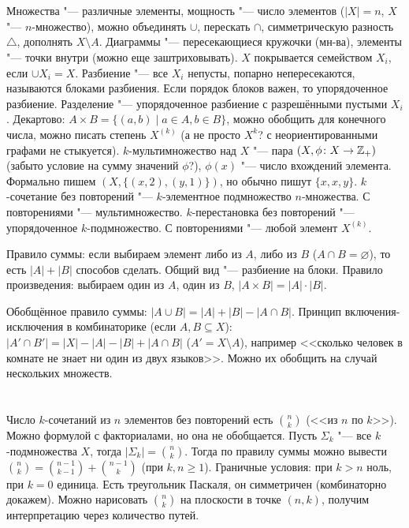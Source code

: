 \section{} %
Множества "--- различные элементы, мощность "--- число элементов ($|X|=n$, $X$ "--- $n$-множество),
можно объединять $\cup$, перескать $\cap$, симметрическую разность $\triangle$, дополнять $X \setminus A$.
Диаграммы "--- пересекающиеся кружочки (мн-ва), элементы "--- точки внутри (можно еще заштриховывать).
$X$ покрывается семейством $X_i$, если $\cup X_i=X$.
Разбиение "--- все $X_i$ непусты, попарно непересекаются, называются блоками разбиения.
Если порядок блоков важен, то упорядоченное разбиение.
Разделение "--- упорядоченное разбиение с разрешёнными пустыми $X_i$.
Декартово: $A \times B = \{(a,b) \mid a \in A, b \in B\}$, можно обобщить для конечного числа,
можно писать степень $X^{(k)}$ (\TODO а не просто $X^k$? с неориентированными графами не стыкуется).
$k$-мультимножество над $X$ "--- пара $(X, \phi \colon X \to \mathbb{Z}_{+})$ (\TODO забыто условие на сумму значений $\phi$?),
$\phi(x)$ "--- число вхождений элемента.
Формально пишем $(X, \{(x, 2), (y, 1)\})$, но обычно пишут $\{x, x, y\}$.
$k$-сочетание без повторений "--- $k$-элементное подмножество $n$-множества.
С повторениями "--- мультимножество.
$k$-перестановка без повторений "--- упорядоченное $k$-подмножество.
С повторениями "--- любой элемент $X^{(k)}$.

Правило суммы: если выбираем элемент либо из $A$, либо из $B$ ($A \cap B=\varnothing$), то есть
$|A|+|B|$ способов сделать.
Общий вид "--- разбиение на блоки.
Правило произведения: выбираем один из $A$, один из $B$, $|A \times B| = |A| \cdot |B|$.

Обобщённое правило суммы: $|A\cup B|=|A|+|B|-|A\cap B|$.
Принцип включения-исключения в комбинаторике (если $A, B\subseteq X$): $|A'\cap B'|=|X|-|A|-|B|+|A\cap B|$ ($A'=X\setminus A$),
например <<сколько человек в комнате не знает ни один из двух языков>>.
Можно их обобщить на случай нескольких множеств.

\section{} %
Число $k$-сочетаний из $n$ элементов без повторений есть $\binom{n}{k}$ (<<из $n$ по $k$>>).
Можно формулой с факториалами, но она не обобщается.
Пусть $\Sigma_k$ "--- все $k$-подмножества $X$, тогда $|\Sigma_k|=\binom{n}{k}$.
Тогда по правилу суммы можно вывести $\binom{n}{k}=\binom{n-1}{k-1}+\binom{n-1}{k}$ (при $k, n \ge 1$).
Граничные условия: при $k>n$ ноль, при $k=0$ единица.
Есть треугольник Паскаля, он симметричен (комбинаторно докажем).
Можно нарисовать $\binom{n}{k}$ на плоскости в точке $(n, k)$, получим интерпретацию через количество путей.

